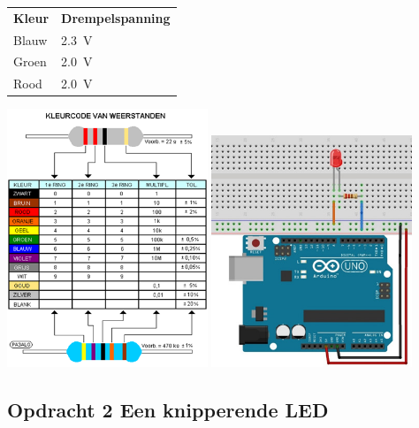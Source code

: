\documentclass{arduino}
\begin{document}
\begin{minipage}[m]{0.6\textwidth}
\begin{tabular}{ll}
\textbf{Kleur} & \textbf{Drempelspanning}\\
Blauw & \SI{2.3}{\volt} \\ 
Groen & \SI{2.0}{\volt} \\
Rood  & \SI{2.0}{\volt} \\
\end{tabular}
\end{minipage}\hfill\begin{minipage}[m]{0.39\textwidth}
\raggedleft
\includegraphics[width=6cm]{7. Component resistor values}
\smallskip
\includegraphics[width=6cm]{8. Circuit switchable LED}
\end{minipage}


\subsection{Opdracht 2 Een knipperende LED}
\end{document}
